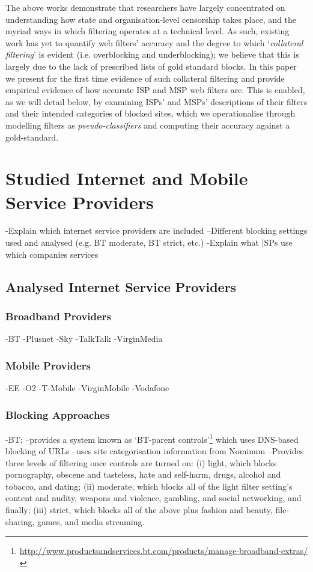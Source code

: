 \documentclass{bmcart}
\begin{document}
The above works demonstrate that researchers have largely concentrated on understanding how state and organisation-level censorship takes place, and the myriad ways in which filtering operates at a technical level.
As such, existing work has yet to quantify web filters' accuracy and the degree to which `\textit{collateral filtering}' is evident (i.e. overblocking and underblocking); we believe that this is largely due to the lack of prescribed lists of gold standard blocks.
In this paper we present for the first time evidence of such collateral filtering and provide empirical evidence of how accurate ISP and MSP web filters are.
This is enabled, as we will detail below, by examining ISPs' and MSPs' descriptions of their filters and their intended categories of blocked sites, which we operationalise through modelling filters as \textit{pseudo-classifiers} and computing their accuracy against a gold-standard.


\clearpage
\section*{Studied Internet and Mobile Service Providers}
-Explain which internet service providers are included
--Different blocking settings used and analysed (e.g. BT moderate, BT strict, etc.)
-Explain what |SPs use which companies services

\subsection*{Analysed Internet Service Providers}

\subsubsection*{Broadband Providers}
-BT
-Plusnet
-Sky
-TalkTalk
-VirginMedia

\subsubsection*{Mobile Providers}
-EE
-O2
-T-Mobile
-VirginMobile
-Vodafone

\subsubsection*{Blocking Approaches}
-BT: 
--provides a system known as `BT-parent controls'\footnote{\url{http://www.productsandservices.bt.com/products/manage-broadband-extras/}} which uses DNS-based blocking of URLs
--uses site categorisation information from Nominum
--Provides three levels of filtering once controls are turned on: (i) light, which blocks pornography, obscene and tasteless, hate and self-harm, drugs, alcohol and tobacco, and dating; (ii) moderate, which blocks all of the light filter setting's content and nudity, weapons and violence, gambling, and social networking, and finally; (iii) strict, which blocks all of the above plus fashion and beauty, file-sharing, games, and media streaming.
\end{document}
